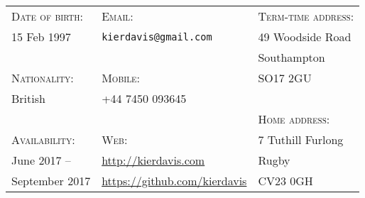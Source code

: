 \vspace{-1em}
\hrulefill
\vspace{1em}

{
\newcommand{\h}[1]{\textsc{#1}:}
\newcommand{\n}[1]{\hspace{.8em} #1}
\begin{tabu} to \textwidth {X[1.3,l] X[2.5,l] X[1.3,l]}
    \h{Date of birth}  & \h{Email}                                 & \h{Term-time address}  \\
    \n{15 Feb 1997}    & \n{\texttt{kierdavis@gmail.com}}          & \n{49 Woodside Road}   \\
                       &                                           & \n{Southampton}        \\
    \h{Nationality}    & \h{Mobile}                                & \n{SO17 2GU}           \\
    \n{British}        & \n{+44 7450 093645}                       &                        \\
                       &                                           & \h{Home address}       \\
    \h{Availability}   & \h{Web}                                   & \n{7 Tuthill Furlong}  \\
    \n{June 2017 --}   & \n{\url{http://kierdavis.com}}            & \n{Rugby}              \\
    \n{September 2017} & \n{\url{https://github.com/kierdavis}}    & \n{CV23 0GH}           \\
\end{tabu}
}

\vspace{1em}
\hrulefill
